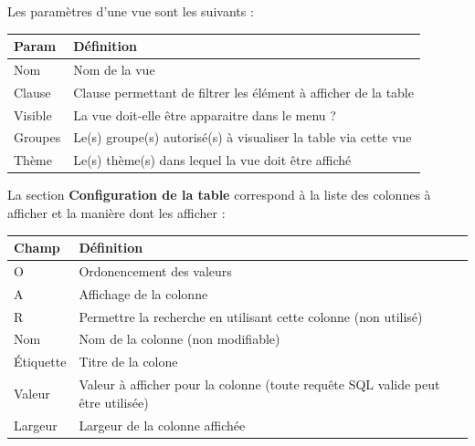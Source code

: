 \documentclass[letterpaper,10pt,french]{sphinxmanual}
\begin{document}

Les paramètres d'une vue sont les suivants :

\begin{tabulary}{\linewidth}{|L|L|}
\hline

\textbf{Param}
 & 
\textbf{Définition}
\\
\hline
Nom
 & 
Nom de la vue
\\
\hline
Clause
 & 
Clause permettant de filtrer les élément à afficher de la table
\\
\hline
Visible
 & 
La vue doit-elle être apparaitre dans le menu ?
\\
\hline
Groupes
 & 
Le(s) groupe(s) autorisé(s) à visualiser la table via cette vue
\\
\hline
Thème
 & 
Le(s) thème(s) dans lequel la vue doit être affiché
\\
\hline\end{tabulary}


La section \textbf{Configuration de la table} correspond à  la liste des
colonnes à afficher et la manière dont les afficher :

\begin{tabulary}{\linewidth}{|L|L|}
\hline

\textbf{Champ}
 & 
\textbf{Définition}
\\
\hline
O
 & 
Ordonencement des valeurs
\\
\hline
A
 & 
Affichage de la colonne
\\
\hline
R
 & 
Permettre la recherche en utilisant cette colonne (non utilisé)
\\
\hline
Nom
 & 
Nom de la colonne (non modifiable)
\\
\hline
Étiquette
 & 
Titre de la colone
\\
\hline
Valeur
 & 
Valeur à afficher pour la colonne (toute requête SQL valide peut être utilisée)
\\
\hline
Largeur
 & 
Largeur de la colonne affichée
\\
\hline\end{tabulary}
\end{document}
